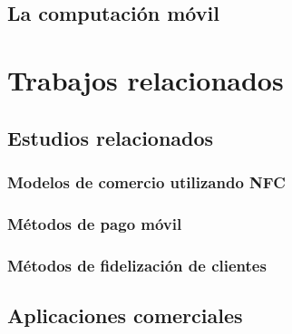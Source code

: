   \subsection{La computación móvil}

\section{Trabajos relacionados}
  \subsection{Estudios relacionados}
    \subsubsection{Modelos de comercio utilizando NFC}
    \subsubsection{Métodos de pago móvil}
    \subsubsection{Métodos de fidelización de clientes}

  \subsection{Aplicaciones comerciales}
